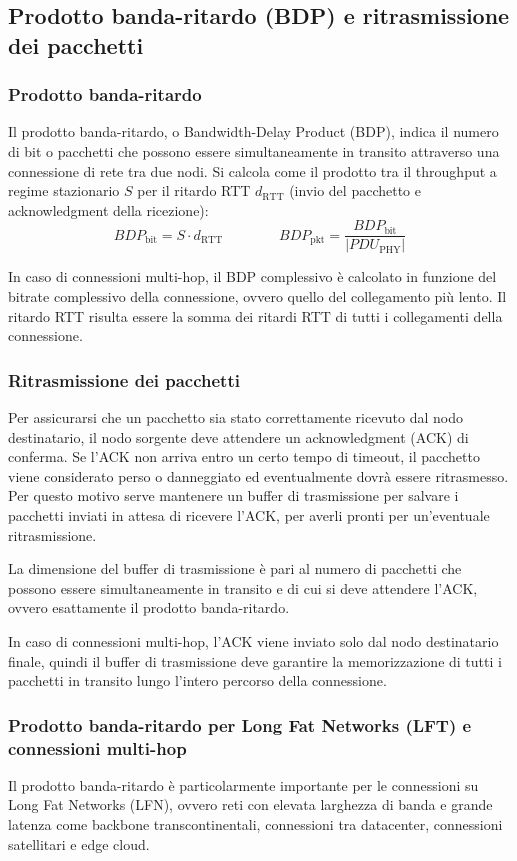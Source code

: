 \subsection{Prodotto banda-ritardo (BDP) e ritrasmissione dei pacchetti}
\subsubsection*{Prodotto banda-ritardo}
Il prodotto banda-ritardo, o Bandwidth-Delay Product (BDP), indica il numero di bit o pacchetti che possono essere
simultaneamente in transito attraverso una connessione di rete tra due nodi. Si calcola come il prodotto tra il throughput
a regime stazionario \(S\) per il ritardo RTT \(d_\text{RTT}\) (invio del pacchetto e acknowledgment della ricezione):
\[BDP_\text{bit} = S \cdot d_\text{RTT} \qquad\qquad BDP_\text{pkt} = \frac{BDP_\text{bit}}{|PDU_\text{PHY}|}\]

In caso di connessioni multi-hop, il BDP complessivo è calcolato in funzione del bitrate complessivo della connessione,
ovvero quello del collegamento più lento. Il ritardo RTT risulta essere la somma dei ritardi RTT di tutti i collegamenti
della connessione.

\subsubsection*{Ritrasmissione dei pacchetti}
Per assicurarsi che un pacchetto sia stato correttamente ricevuto dal nodo destinatario, il nodo sorgente deve attendere un
acknowledgment (ACK) di conferma. Se l'ACK non arriva entro un certo tempo di timeout, il pacchetto viene considerato
perso o danneggiato ed eventualmente dovrà essere ritrasmesso. Per questo motivo serve mantenere un buffer di trasmissione
per salvare i pacchetti inviati in attesa di ricevere l'ACK, per averli pronti per un'eventuale ritrasmissione.

La dimensione del buffer di trasmissione è pari al numero di pacchetti che possono essere simultaneamente in transito
e di cui si deve attendere l'ACK, ovvero esattamente il prodotto banda-ritardo.

In caso di connessioni multi-hop, l'ACK viene inviato solo dal nodo destinatario finale, quindi il buffer di trasmissione
deve garantire la memorizzazione di tutti i pacchetti in transito lungo l'intero percorso della connessione.

\subsubsection*{Prodotto banda-ritardo per Long Fat Networks (LFT) e connessioni multi-hop}
Il prodotto banda-ritardo è particolarmente importante per le connessioni su Long Fat Networks (LFN), ovvero reti con
elevata larghezza di banda e grande latenza come backbone transcontinentali, connessioni tra datacenter, connessioni
satellitari e edge cloud.

